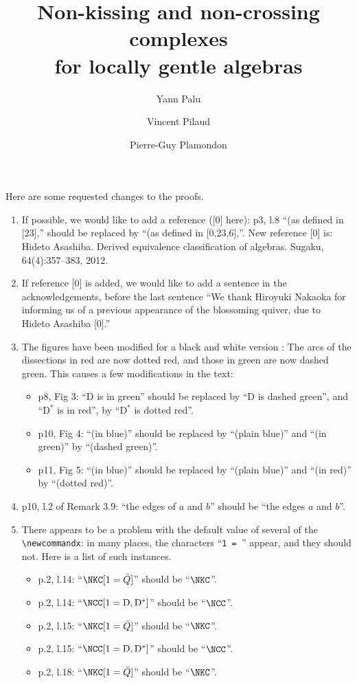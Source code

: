 \documentclass{amsart}
\title[Non-kissing and non-crossing complexes for locally gentle algebras]{Non-kissing and non-crossing complexes \\ for locally gentle algebras}
\author{Yann Palu}
\author{Vincent Pilaud}
\author{Pierre-Guy Plamondon}
\theoremstyle{definition}
\newcommand{\dual}{^*} %
\newcommand{\dissection}{\mathrm{D}} %
\begin{document}
Here are some requested changes to the proofs.

\begin{enumerate}
 \item If possible, we would like to add a reference ([0] here): p3, l.8 ``(as defined in [23],'' should be replaced by ``(as defined in [0,23,6],''. New reference [0] is: Hideto Asashiba. Derived equivalence classification of algebras. Sugaku, 64(4):357--383, 2012. 
 \item If reference [0] is added, we would like to add a sentence in the acknowledgements, before the last sentence ``We thank Hiroyuki Nakaoka for informing us of a previous appearance of the blossoming quiver, due to Hideto Asashiba [0].''
 \item The figures have been modified for a black and white version : The arcs of the dissections in red are now dotted red, and those in green are now dashed green. This causes a few modifications in the text:
   \begin{itemize}
    \item p8, Fig 3: ``$\dissection$ is in green'' should be replaced by ``$\dissection$ is dashed green'', and ``$\dissection\dual$ is in red'', by ``$\dissection\dual$ is dotted red''.
    \item p10, Fig 4: ``(in blue)'' should be replaced by ``(plain blue)'' and ``(in green)'' by ``(dashed green)''.
    \item p11, Fig 5: ``(in blue)'' should be replaced by ``(plain blue)'' and ``(in red)'' by ``(dotted red)''.
   \end{itemize}
 \item p10, l.2 of Remark 3.9: ``the edges of $a$ and $b$'' should be ``the edges $a$ and $b$''.
 \item There appears to be a problem with the default value of several of the \verb|\newcommandx|: in many places, the characters ``\verb|1 = |'' appear, and they should not.  Here is a list of such instances.
   \begin{itemize}
    \item p.2, l.14: ``$\NKC[1=\bar Q]$'' should be ``$\NKC$''.
    \item p.2, l.14: ``$\NCC[1=\dissection,\dissection\dual]$'' should be ``$\NCC$''.
    \item p.2, l.15: ``$\NKC[1=\bar Q]$'' should be ``$\NKC$''.
    \item p.2, l.15: ``$\NCC[1=\dissection,\dissection\dual]$'' should be ``$\NCC$''.
    \item p.2, l.18: ``$\NKC[1=\bar Q]$'' should be ``$\NKC$''.

\end{itemize}
\end{enumerate}
\end{document}
